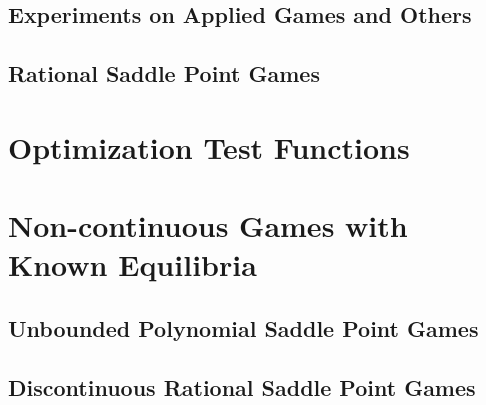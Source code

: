 \documentclass[../main.tex]{subfiles}
\begin{document}
\subsection{Experiments on Applied Games and Others}

\subsection{Rational Saddle Point Games}


\section{Optimization Test Functions}


\section{Non-continuous Games with Known Equilibria}

\subsection{Unbounded Polynomial Saddle Point Games}

\subsection{Discontinuous Rational Saddle Point Games}

\end{document}

